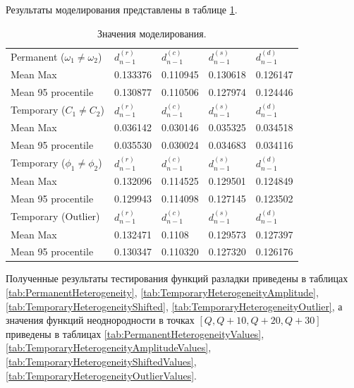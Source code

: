 \documentclass[specialist, substylefile = spbu.rtx,
			   subf, href, 12pt]{disser}
\begin{document}
Результаты моделирования представлены в таблице \ref{tab:ModellingResults}.
\begin{table}[!hhh]
	\center
	\caption{Значения моделирования.}
	\begin{tabular}{l|llll}
		Permanent ($\omega_1 \neq \omega_2$) & $ d_{n-1}^{(r)} $ & $ d_{n-1}^{(c)} $ & $ d_{n-1}^{(s)} $ & $ d_{n-1}^{(d)} $ \\
		Mean Max & 0.133376 & 0.110945 & 0.130618 & 0.126147 \\
		Mean 95 procentile & 0.130877 & 0.110506 & 0.127974 & 0.124446 \\
		\hline
		Temporary ($C_1 \neq C_2$) & $ d_{n-1}^{(r)} $ & $ d_{n-1}^{(c)} $ & $ d_{n-1}^{(s)} $ & $ d_{n-1}^{(d)} $ \\
		Mean Max & 0.036142 & 0.030146 & 0.035325 & 0.034518 \\
		Mean 95 procentile & 0.035530 & 0.030024 & 0.034683 & 0.034116 \\
		\hline
		Temporary ($\phi_1 \neq \phi_2$) & $ d_{n-1}^{(r)} $ & $ d_{n-1}^{(c)} $ & $ d_{n-1}^{(s)} $ & $ d_{n-1}^{(d)} $ \\
		Mean Max & 0.132096 & 0.114525 & 0.129501 & 0.124849 \\
		Mean 95 procentile & 0.129943 & 0.114098 & 0.127145 & 0.123502 \\
		\hline
		Temporary (Outlier) & $ d_{n-1}^{(r)} $ & $ d_{n-1}^{(c)} $ & $ d_{n-1}^{(s)} $ & $ d_{n-1}^{(d)} $ \\
		Mean Max & 0.132471 & 0.1108 & 0.129573 & 0.127397 \\
		Mean 95 procentile & 0.130347 & 0.110320 & 0.127320 & 0.126176
	\end{tabular}
	\label{tab:ModellingResults}
\end{table}


Полученные результаты тестирования функций разладки приведены в таблицах \ref{tab:PermanentHeterogeneity}, \ref{tab:TemporaryHeterogeneityAmplitude}, \ref{tab:TemporaryHeterogeneityShifted}, \ref{tab:TemporaryHeterogeneityOutlier}, а значения функций неоднородности в точках $[Q, Q+10, Q+20, Q+30] $ приведены в таблицах \ref{tab:PermanentHeterogeneityValues}, \ref{tab:TemporaryHeterogeneityAmplitudeValues}, \ref{tab:TemporaryHeterogeneityShiftedValues}, \ref{tab:TemporaryHeterogeneityOutlierValues}.
\end{document}
